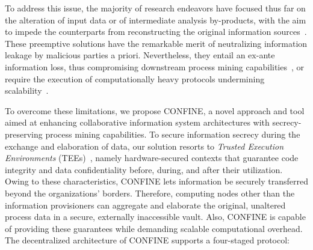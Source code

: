 %
%
\begin{newj}
%
To address this issue, the majority of research endeavors have focused thus far on the alteration of input data or of intermediate analysis by-products, with the aim to impede the counterparts from reconstructing the original information sources~\cite{DBLP:journals/dke/FahrenkrogPetersenAW23,DBLP:conf/icpm/Fahrenkrog-Petersen19,elkoumy2020shareprom,elkoumy2020secure}. These preemptive solutions have the remarkable merit of neutralizing information leakage by malicious parties a priori. Nevertheless, they entail an ex-ante information loss, thus compromising downstream process mining capabilities~\cite{DBLP:journals/dke/FahrenkrogPetersenAW23,DBLP:conf/icpm/Fahrenkrog-Petersen19}, or require the execution of computationally heavy protocols undermining scalability~\cite{elkoumy2020shareprom,elkoumy2020secure}.

To overcome these limitations, we propose CONFINE, a novel approach and tool aimed at enhancing collaborative information system architectures with secrecy-preserving process mining capabilities. To secure information secrecy during the exchange and elaboration of data, our solution resorts to \emph{Trusted Execution Environments} (TEEs)~\cite{DBLP:conf/trustcom/SabtAB15}, namely hardware-secured contexts that guarantee code integrity and data confidentiality before, during, and after their utilization. Owing to these characteristics, CONFINE lets information be securely transferred beyond the organizations' borders. Therefore, computing nodes other than the information provisioners can aggregate and elaborate the original, unaltered process data in a secure, externally inaccessible vault. Also, CONFINE is capable of providing these guarantees while demanding scalable computational overhead. 
%
The decentralized architecture of CONFINE supports a four-staged protocol:
\end{newj}
